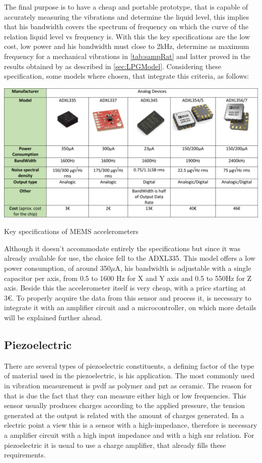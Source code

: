 The final purpose is to have a cheap and portable prototype, that is capable of accurately measuring the vibrations and determine the liquid level, this implies that his bandwidth covers the spectrum of frequency on which the curve of the relation liquid level vs frequency is. With this the key specifications are the low cost, low power and his bandwidth must close to 2kHz, determine as maximum frequency for a mechanical vibrations in \ref{tab:sampRat} and latter proved in the results obtained by \citeauthor{wuLiquidLevelDetector2014b} as described in \ref{sec:LPGModel}. Considering these specification, some models where chosen, that integrate this criteria, as follows:
\begin{table}
    \centering
    \includegraphics[width=1\textwidth]{Chapters/4CHP/Figures/accTable.pdf}
    \caption{Key specifications of MEMS accelerometers}
    \label{tab:acctable}
\end{table}
Although it doesn't accommodate entirely the specifications but since it was already available for use, the choice fell to the ADXL335. This model offers a low power consumption, of around 350$\mu$A, his bandwidth is adjustable with a single capacitor per axis, from 0.5 to 1600 Hz for X and Y axis and 0.5 to 550Hz for Z axis. Beside this the accelerometer itself is very cheap, with a price starting at 3€. To properly acquire the data from this sensor and process it, is necessary to integrate it with an amplifier circuit and a microcontroller, on which more details will be explained further ahead.
\subsection{Piezoelectric}
There are several types of piezoelectric constituents, a defining factor of the type of material used in the piezoelectric, is his application. The most commonly used in vibration measurement is \acrshort{pvdf} as polymer and \acrshort{pzt} as ceramic. The reason for that is due the fact that they can measure either high or low frequencies. This sensor usually produces charges according to the applied pressure, the tension generated at the output is related with the amount of charges generated. In a electric point a view this is a sensor with a high-impedance, therefore is necessary a amplifier circuit with a high input impedance and with a high \acrshort{snr} relation. For piezoelectric it is usual to use a charge amplifier, that already fills these requirements.

